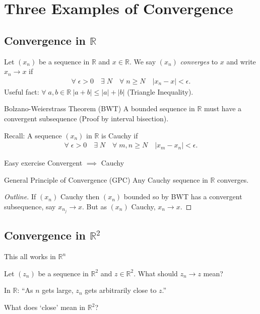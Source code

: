 \section{Three Examples of Convergence} \label{sec:1}
\subsection{Convergence in $\mathbb{R}$}
Let $(x_n)$ be a sequence in $\mathbb{R}$ and $x \in \mathbb{R}$.
We say $(x_n)$ \textit{converges} to $x$ and write $x_n \to x$ if
\begin{align*}
    \forall \; \epsilon > 0 \quad \exists \; N \quad \forall \; n \geq N \quad |x_n - x| < \epsilon.
\end{align*} 
Useful fact: $\forall \; a, b \in \mathbb{R} \ |a+b| \leq |a| + |b|$ (Triangle Inequality).

Bolzano-Weierstrass Theorem (BWT)
A bounded sequence in $\mathbb{R}$ must have a convergent subsequence (Proof by interval bisection).

Recall: A sequence $(x_n)$ in $\mathbb{R}$ is Cauchy if 
\begin{align*}
    \forall \; \epsilon > 0 \quad \exists \; N \quad \forall \; m, n \geq N \quad |x_m - x_n| < \epsilon.
\end{align*} 

Easy exercise Convergent $\implies$ Cauchy

General Principle of Convergence (GPC)
Any Cauchy sequence in $\mathbb{R}$ converges.

\begin{proof}[Outline]
    If $(x_n)$ Cauchy then $(x_n)$ bounded so by BWT has a convergent subsequence, say $x_{n_j} \to x$.
    But as $(x_n)$ Cauchy, $x_n \to x$.
\end{proof} 

\subsection{Convergence in $\mathbb{R}^2$}
\begin{remark}
    This all works in $\mathbb{R}^n$
\end{remark} 

Let $(z_n)$ be a sequence in $\mathbb{R}^2$ and $z \in \mathbb{R}^2$.
What should $z_n \to z$ mean?

In $\mathbb{R}$: ``As $n$ gets large, $z_n$ gets arbitrarily close to $z$.''

What does `close' mean in $\mathbb{R}^2$?

